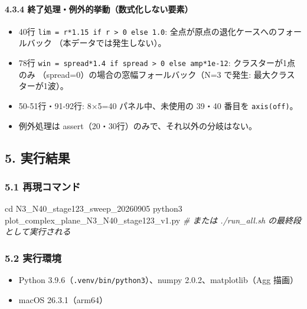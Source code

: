 \documentclass[
  a4paper,
]{ltjsarticle}
\newenvironment{Shaded}{}{}
\newcommand{\BuiltInTok}[1]{\textcolor[rgb]{0.00,0.50,0.00}{#1}}
\newcommand{\CommentTok}[1]{\textcolor[rgb]{0.38,0.63,0.69}{\textit{#1}}}
\newcommand{\ExtensionTok}[1]{#1}
\newcommand{\NormalTok}[1]{#1}
\providecommand{\tightlist}{%
  \setlength{\itemsep}{0pt}\setlength{\parskip}{0pt}}
\begin{document}
\paragraph{4.3.4
終了処理・例外的挙動（数式化しない要素）}\label{ux7d42ux4e86ux51e6ux7406ux4f8bux5916ux7684ux6319ux52d5ux6570ux5f0fux5316ux3057ux306aux3044ux8981ux7d20}

\begin{itemize}
\tightlist
\item
  40行 \texttt{lim\ =\ r*1.15\ if\ r\ \textgreater{}\ 0\ else\ 1.0}:
  全点が原点の退化ケースへのフォールバック （本データでは発生しない）。
\item
  78行
  \texttt{win\ =\ spread*1.4\ if\ spread\ \textgreater{}\ 0\ else\ amp*1e-12}:
  クラスターが1点のみ （spread=0）の場合の窓幅フォールバック（N=3
  で発生: 最大クラスターが1波）。
\item
  50-51行・91-92行: 8×5=40 パネル中、未使用の 39・40 番目を
  \texttt{axis(\textquotesingle{}off\textquotesingle{})}。
\item
  例外処理は assert（20・30行）のみで、それ以外の分岐はない。
\end{itemize}

\subsection{5. 実行結果}\label{ux5b9fux884cux7d50ux679c}

\subsubsection{5.1
再現コマンド}\label{ux518dux73feux30b3ux30deux30f3ux30c9}

\begin{Shaded}
\begin{Highlighting}[]
\BuiltInTok{cd}\NormalTok{ N3\_N40\_stage123\_sweep\_20260905}
\ExtensionTok{python3}\NormalTok{ plot\_complex\_plane\_N3\_N40\_stage123\_v1.py}
\CommentTok{\# または ./run\_all.sh の最終段として実行される}
\end{Highlighting}
\end{Shaded}

\subsubsection{5.2 実行環境}\label{ux5b9fux884cux74b0ux5883}

\begin{itemize}
\tightlist
\item
  Python 3.9.6（\texttt{.venv/bin/python3}）、numpy
  2.0.2、matplotlib（Agg 描画）
\item
  macOS 26.3.1（arm64）
\end{itemize}
\end{document}
